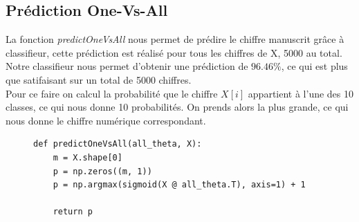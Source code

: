 \subsection{Prédiction One-Vs-All}

La fonction \textit{predictOneVsAll} nous permet de prédire le chiffre manuscrit grâce à classifieur, cette prédiction est réalisé pour tous les chiffres de X, 5000 au total. \\
Notre classifieur nous permet d'obtenir une prédiction de $96.46\%$, ce qui est plus que satifaisant sur un total de 5000 chiffres.\\


Pour ce faire on calcul la probabilité que le chiffre $X[i]$ appartient à l'une des 10 classes, ce qui nous donne 10 probabilités. On prends alors la plus grande, ce qui nous donne le chiffre numérique
correspondant.

\begin{figure}[!h]
\begin{verbatim}
def predictOneVsAll(all_theta, X):
    m = X.shape[0]
    p = np.zeros((m, 1))
    p = np.argmax(sigmoid(X @ all_theta.T), axis=1) + 1

    return p
\end{verbatim}   
\end{figure}
